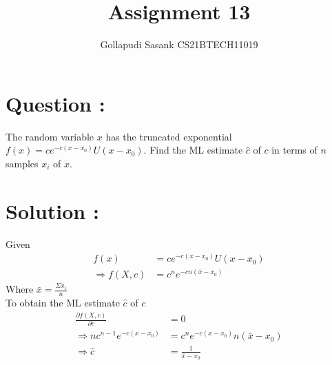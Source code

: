 \documentclass[journal,twocolumn,12pt]{IEEEtran}
\title{Assignment 13}
\author{Gollapudi Sasank CS21BTECH11019}
\begin{document}
\maketitle
\section*{Question : }
The random variable $x$ has the truncated exponential $f(x) = ce^{-c(x-x_0)}U(x-x_0)$. Find the ML estimate $\hat{c}$ of $c$ in terms of $n$ samples $x_i$ of $x$.
\section*{Solution : }
Given 
\begin{align}
f(x) &= ce^{-c(x-x_0)}U(x-x_0) \\
\Rightarrow f(X,c) &= c^ne^{-cn(\bar{x}-x_0)} 
\end{align}
Where $\bar{x} = \frac{\Sigma x_i}{n}$ \\
To obtain the ML estimate $\hat{c}$ of $c$ 
\begin{align}
\frac{\partial{f(X,c)}}{\partial{c}} &= 0 \\
\Rightarrow nc^{n-1}e^{-c(x-x_0)}&= c^ne^{-c(x-x_0)}n(\bar{x}-x_0) \\
\Rightarrow \hat{c} &= \frac{1}{\bar{x} - x_0}
\end{align}
\end{document}

